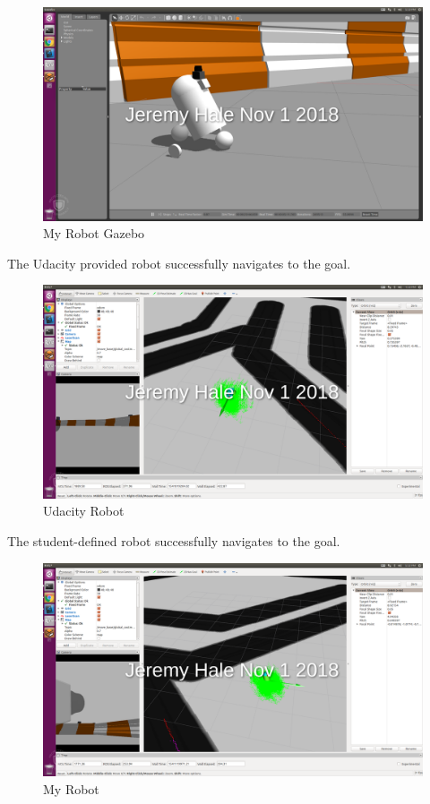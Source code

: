 \documentclass[10pt,journal,compsoc]{IEEEtran}
\begin{document}
\begin{figure}[thpb]
      \centering
      \includegraphics[width=\linewidth]{my_bot_gazebo}
      \caption{My Robot Gazebo}
      \label{fig:robot1}
\end{figure}


The Udacity provided robot successfully navigates to the goal.
\begin{figure}[thpb]
      \centering
      \includegraphics[width=\linewidth]{udacity_bot_goal_close}
      \caption{Udacity Robot}
      \label{fig:robot2}
\end{figure}

The student-defined robot successfully navigates to the goal.

\begin{figure}[thpb]
      \centering
      \includegraphics[width=\linewidth]{my_bot_rvis}
      \caption{My Robot}
      \label{fig:robot3}
\end{figure}
\end{document}
